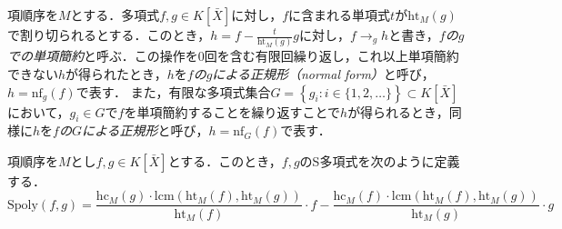 項順序を$M$とする．多項式$f, g \in K[\bar{X}]$に対し，$f$に含まれる単項式$t$が$\mathrm{ht}_M(g)$で割り切られるとする．このとき，$h = f - \frac{t}{\mathrm{ht}_M(g)}g$に対し，$f \to_g h$と書き，\emph{$f$の$g$での単項簡約}と呼ぶ．この操作を$0$回を含む有限回繰り返し，これ以上単項簡約できない$h$が得られたとき，$h$を\emph{$f$の$g$による正規形（normal form）}と呼び，$h = \mathrm{nf}_g(f)$で表す．
また，有限な多項式集合$G=\left\{g_i :i \in \{1,2, \dots\}\right\} \subset K[\bar{X}]$において，$g_i \in G$で$f$を単項簡約することを繰り返すことで$h$が得られるとき，同様に$h$を\emph{$f$の$G$による正規形}と呼び，$h = \mathrm{nf}_G(f)$で表す．
\begin{definition}[S多項式]
	項順序を$M$とし$f, g \in K[\bar{X}]$とする．このとき，$f, g$のS多項式を次のように定義する．
	$$\mathrm{Spoly}(f, g)=\frac{\mathrm{hc}_M(g)\cdot \mathrm{lcm}(\mathrm{ht}_M(f), \mathrm{ht}_M(g))}{\mathrm{ht}_M(f)}\cdot f - \frac{\mathrm{hc}_M(f)\cdot \mathrm{lcm}(\mathrm{ht}_M(f), \mathrm{ht}_M(g))}{\mathrm{ht}_M(g)}\cdot g$$
	\end{definition}








